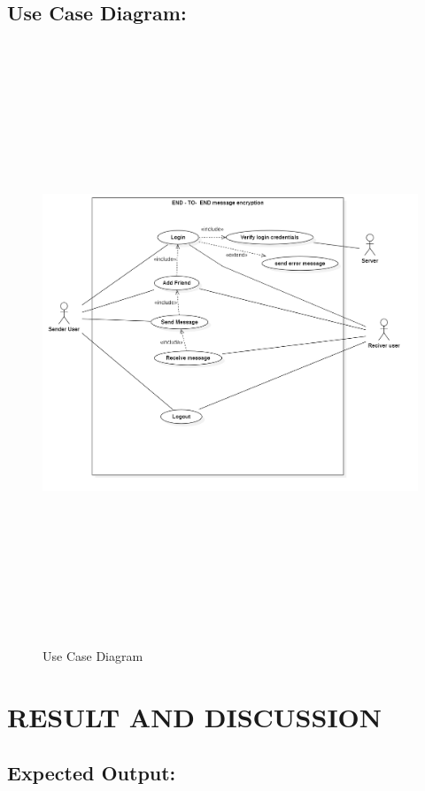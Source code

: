 \section{Use Case Diagram:}
\begin{figure}[H]
	\centering
	\includegraphics[width=180mm, height=180mm]{images/UseCaseDiagram1.png}
	\caption{Use Case Diagram} %
	\label{figusecase} %
\end{figure}




\chapter{RESULT AND DISCUSSION}

\section{ Expected Output:}

